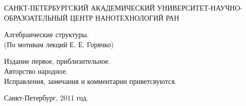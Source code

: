 \begin{titlepage}
\newpage

\begin{center}
САНКТ-ПЕТЕРБУРГСКИЙ АКАДЕМИЧЕСКИЙ УНИВЕРСИТЕТ-НАУЧНО-ОБРАЗОАТЕЛЬНЫЙ ЦЕНТР НАНОТЕХНОЛОГИЙ РАН
\end{center}
\hrulefill


\vspace{8em}

\begin{center}
\Large Алгебраические структуры. \\ (По мотивам лекций Е. Е. Горячко)
\end{center}

\vspace{2.5em}

\begin{flushleft}
Издание первое, приблизительное. \\
Авторство народное. \\
Исправления, замечания и комментарии приветсвуются.
\end{flushleft}

\vspace{\fill}

\begin{center}
Санкт-Петербург, 2011 год.
\end{center}

\end{titlepage}
